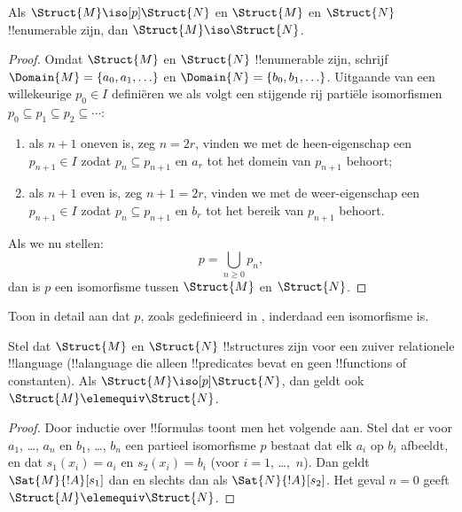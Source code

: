 \documentclass[../../../include/open-logic-section]{subfiles}
\begin{document}
\begin{thm}
  Als $\Struct{M} \iso[p] \Struct{N}$ en $\Struct{M}$ en
  $\Struct{N}$ !!{enumerable} zijn, dan $\Struct{M} \iso
  \Struct{N}$.
\end{thm}

\begin{proof}
  Omdat $\Struct{M}$ en $\Struct{N}$ !!{enumerable} zijn, schrijf
  $\Domain{M} = \{a_0, a_1, \ldots \}$ en $\Domain{N} =
  \{b_0, b_1, \ldots \}$. Uitgaande van een willekeurige $p_0 \in I$
  definiëren we als volgt een stijgende rij partiële isomorfismen
  $p_0 \subseteq p_1 \subseteq p_2 \subseteq \cdots$:
  \begin{enumerate}
  \item als $n+1$ oneven is, zeg $n = 2r$, vinden we met de
    heen-eigenschap een $p_{n+1} \in I$ zodat $p_n \subseteq p_{n+1}$
    en $a_r$ tot het domein van $p_{n+1}$ behoort;
  \item als $n+1$ even is, zeg $n+1 =2r$, vinden we met de
    weer-eigenschap een $p_{n+1} \in I$ zodat $p_n \subseteq p_{n+1}$
    en $b_r$ tot het bereik van $p_{n+1}$ behoort.
  \end{enumerate}
Als we nu stellen:
\[
p = \bigcup_{n\ge 0} p_n,
\]
dan is $p$ een isomorfisme tussen $\Struct{M}$ en
$\Struct{N}$.
\end{proof}

\begin{prob}
  Toon in detail aan dat $p$, zoals gedefinieerd in
  , inderdaad een isomorfisme is.
\end{prob}

\begin{thm}
  Stel dat $\Struct{M}$ en $\Struct{N}$ !!{structure}s zijn voor een
  zuiver relationele !!{language} (!!a{language} die alleen
  !!{predicate}s bevat en geen !!{function}s of constanten). Als
  $\Struct{M} \iso[p] \Struct{N}$, dan geldt ook
  $\Struct{M} \elemequiv \Struct{N}$.
\end{thm}

\begin{proof}
  Door inductie over !!{formula}s toont men het volgende aan. Stel dat
  er voor $a_1$, \dots, $a_n$ en $b_1$, \dots, $b_n$ een partieel
  isomorfisme $p$ bestaat dat elk $a_i$ op $b_i$ afbeeldt, en dat
  $s_1(x_i) =a_i$ en $s_2(x_i) =b_i$ (voor $i =1$, \dots,~$n$).
  Dan geldt $\Sat{M}{!A}[s_1]$ dan en slechts dan als
  $\Sat{N}{!A}[s_2]$. Het geval $n=0$ geeft
  $\Struct{M} \elemequiv \Struct{N}$.
\end{proof}
\end{document}
